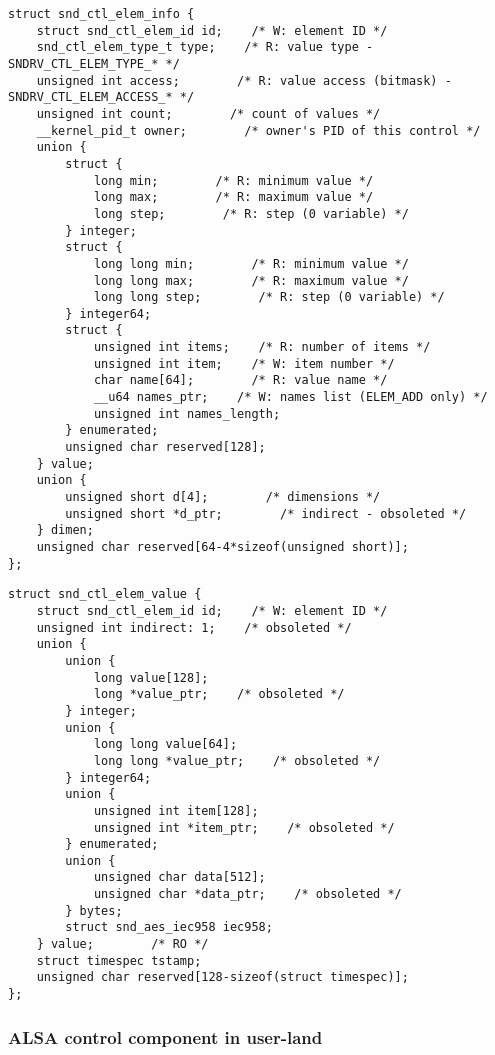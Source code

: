 \documentclass[onecolumn]{article}
\begin{document}
\begin{verbatim}
struct snd_ctl_elem_info {
    struct snd_ctl_elem_id id;    /* W: element ID */
    snd_ctl_elem_type_t type;    /* R: value type - SNDRV_CTL_ELEM_TYPE_* */
    unsigned int access;        /* R: value access (bitmask) - SNDRV_CTL_ELEM_ACCESS_* */
    unsigned int count;        /* count of values */
    __kernel_pid_t owner;        /* owner's PID of this control */
    union {
        struct {
            long min;        /* R: minimum value */
            long max;        /* R: maximum value */
            long step;        /* R: step (0 variable) */
        } integer;
        struct {
            long long min;        /* R: minimum value */
            long long max;        /* R: maximum value */
            long long step;        /* R: step (0 variable) */
        } integer64;
        struct {
            unsigned int items;    /* R: number of items */
            unsigned int item;    /* W: item number */
            char name[64];        /* R: value name */
            __u64 names_ptr;    /* W: names list (ELEM_ADD only) */
            unsigned int names_length;
        } enumerated;
        unsigned char reserved[128];
    } value;
    union {
        unsigned short d[4];        /* dimensions */
        unsigned short *d_ptr;        /* indirect - obsoleted */
    } dimen;
    unsigned char reserved[64-4*sizeof(unsigned short)];
};
\end{verbatim}

\begin{verbatim}
struct snd_ctl_elem_value {
    struct snd_ctl_elem_id id;    /* W: element ID */
    unsigned int indirect: 1;    /* obsoleted */
    union {
        union {
            long value[128];
            long *value_ptr;    /* obsoleted */
        } integer;
        union {
            long long value[64];
            long long *value_ptr;    /* obsoleted */
        } integer64;
        union {
            unsigned int item[128];
            unsigned int *item_ptr;    /* obsoleted */
        } enumerated;
        union {
            unsigned char data[512];
            unsigned char *data_ptr;    /* obsoleted */
        } bytes;
        struct snd_aes_iec958 iec958;
    } value;        /* RO */
    struct timespec tstamp;
    unsigned char reserved[128-sizeof(struct timespec)];
};
\end{verbatim}

\subsubsection{ALSA control component in user-land}
\end{document}
